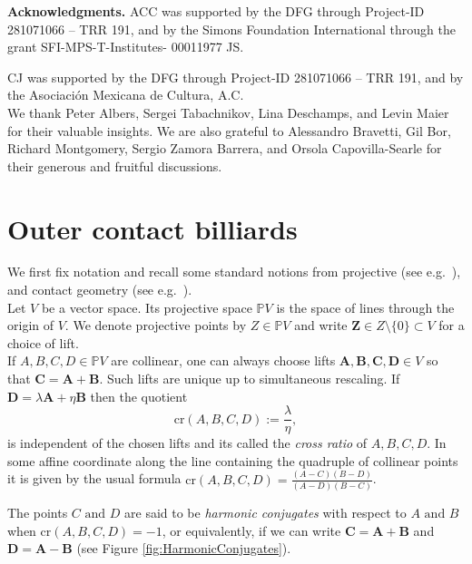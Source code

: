\documentclass{article}
\begin{document}
\textbf{Acknowledgments.} ACC was supported by the DFG through Project-ID 281071066 – TRR 
191, and by the Simons Foundation International through the grant SFI-MPS-T-Institutes-
00011977 JS.

CJ was supported by the DFG through Project-ID 281071066 – TRR 191, and by the Asociación 
Mexicana de Cultura, A.C. \\

We thank Peter Albers, Sergei Tabachnikov, Lina Deschamps, and Levin Maier for their valuable 
insights. We are also grateful to Alessandro Bravetti, Gil Bor, Richard Montgomery, Sergio Zamora Barrera, and Orsola 
Capovilla-Searle for their generous and fruitful discussions.


\section{Outer contact billiards}
\label{sec:defi}

We first fix notation and recall some standard notions from projective (see e.g.~\cite{pottmann2001computational}), and contact geometry (see e.g.~\cite{EDSIV}).\\

Let $V$ be a vector space. Its projective space $\mathbb{P}V$ is the space of lines 
through the origin of $V$. We denote projective points by $Z \in \mathbb{P}V$ and write 
$\boldsymbol{Z} \in Z \setminus \{0\}\subset V$ for a choice of lift. \\

If $A,B,C,D \in \mathbb{P}V$ are collinear, one can always choose lifts 
$\boldsymbol{A}, \boldsymbol{B}, \boldsymbol{C}, \boldsymbol{D} \in V$ so that 
$\boldsymbol{C}= \boldsymbol{A}+\boldsymbol{B}$. Such lifts are unique up to simultaneous 
rescaling. If $\boldsymbol{D}=\lambda\boldsymbol{A}+\eta\boldsymbol{B}$ then the quotient
\[\text{cr}(A,B,C,D):=\dfrac{\lambda}{\eta},\]
is independent of the chosen lifts and its called the \emph{cross ratio} of $A, B, C, D$. In some affine coordinate along the line containing the quadruple of collinear points it is given by the usual formula $\text{cr}(A,B,C,D) = \frac{(A-C)(B-D)}{(A-D)(B-C)}$.

The points $C \text{ and } D$ are said to be \emph{harmonic conjugates} with respect to
$A \text{ and } B$ when $\text{cr}(A,B, C, D)=-1$, or equivalently, if we can write 
$\boldsymbol{C}= \boldsymbol{A}+\boldsymbol{B}$ and $\boldsymbol{D}=\boldsymbol{A}-\boldsymbol{B}$ (see Figure \ref{fig:HarmonicConjugates}). \\
\end{document}
